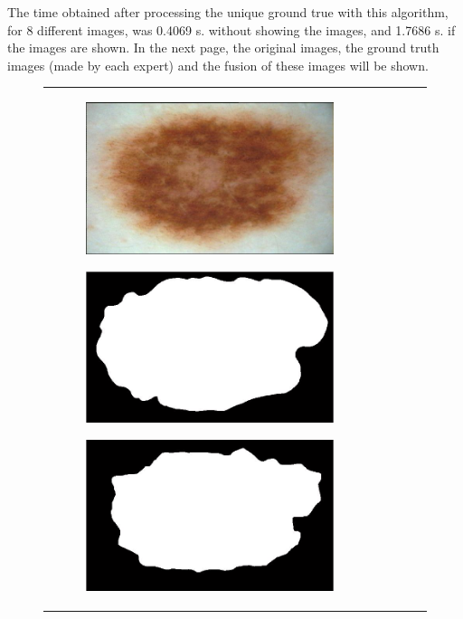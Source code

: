 \documentclass[a4paper, 10pt, conference]{ieeeconf}        %
\begin{document}
The time obtained after processing the unique ground true with this algorithm, for 8 different images, was 0.4069 s. without showing the images, and 1.7686 s. if the images are shown. In the next page, the original images, the ground truth images (made by each expert) and the fusion of these images will be shown.
\clearpage
\begin{figure}[ht!]
 \centering
 \begin{tabular}{c c c c c}
 \begin{subfigure}{0.2\textwidth}
 \includegraphics[scale=0.15]{original01.JPG}
 \end{subfigure}
 \begin{subfigure}{0.2\textwidth}
 \includegraphics[scale=0.2]{expert_1GroundTrue_01.JPG}
 \end{subfigure}
 \begin{subfigure}{0.2\textwidth}
  \includegraphics[scale=0.2]{expert_2GroundTrue_01.JPG}

\end{subfigure}
\end{tabular}
\end{figure}
\end{document}

